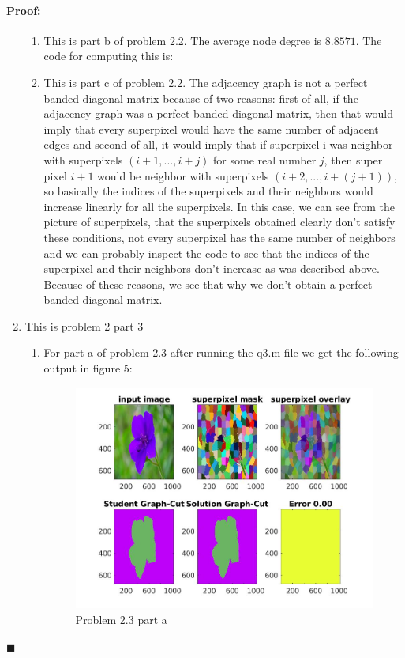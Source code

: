 \documentclass[12pt]{article}
\newenvironment{proof}{\paragraph{Proof: }}{\hfill$\blacksquare$}
\begin{document}
\begin{proof}
\begin{enumerate}
\begin{enumerate}
\item This is part b of problem 2.2. The average node degree is $8.8571$. The code for computing this is:



\item This is part c of problem 2.2. The adjacency graph is not a perfect banded diagonal matrix because of two reasons: first of all, if the adjacency graph was a perfect banded diagonal matrix, then that would imply that every superpixel would have the same number of adjacent edges and second of all, it would imply that if superpixel i was neighbor with superpixels $(i + 1, ..., i+j)$ for some real number $j$, then super pixel $i + 1$ would be neighbor with superpixels $(i+2,..., i+(j+1))$, so basically the indices of the superpixels and their neighbors would increase linearly for all the superpixels. In this case, we can see from the picture of superpixels, that the superpixels obtained clearly don't satisfy these conditions, not every superpixel has the same number of neighbors and we can probably inspect the code to see that the indices of the superpixel and their neighbors don't increase as was described above. Because of these reasons, we see that why we don't obtain a perfect banded diagonal matrix.

\end{enumerate}

\item This is problem 2 part 3

\begin{enumerate}

\item For part a of problem 2.3 after running the q3.m file we get the following output in figure 5:

\begin{figure}[!htbp]
\centering
\includegraphics[width=18cm]{problem_2_3b.jpg}
\caption{Problem 2.3 part a}
\end{figure}


\end{enumerate}
\end{enumerate}
\end{proof}
\end{document}
